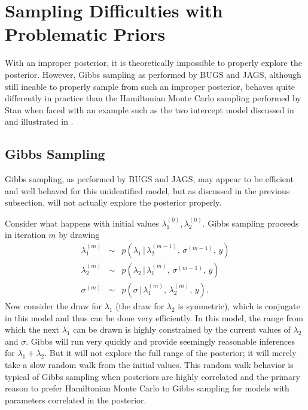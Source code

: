 \section{Sampling Difficulties with Problematic Priors}

With an improper posterior, it is theoretically impossible to properly
explore the posterior. However, Gibbs sampling as performed by BUGS
and JAGS, although still ineable to properly sample from such an
improper posterior, behaves quite differently in practice than the
Hamiltonian Monte Carlo sampling performed by Stan when faced with an
example such as the two intercept model discussed in
 and illustrated in
.

\subsection{Gibbs Sampling}

Gibbs sampling, as performed by BUGS and JAGS, may appear to be
efficient and well behaved for this unidentified model, but as
discussed in the previous subsection, will not actually explore the
posterior properly.

Consider what happens with initial values $\lambda_1^{(0)}, \lambda_2^{(0)}$.
Gibbs sampling proceeds in iteration $m$ by drawing
%
\begin{eqnarray*}
\lambda_1^{(m)} 
& \sim & p(\lambda_1 \, | \, \lambda_2^{(m-1)}, \, \sigma^{(m-1)}, \, y)
\\[6pt]
\lambda_2^{(m)}
& \sim & p(\lambda_2 \, | \, \lambda_1^{(m)}, \, \sigma^{(m-1)}, \, y)
\\[6pt]
\sigma^{(m)} 
& \sim & p(\sigma \, | \, \lambda_1^{(m)}, \, \lambda_2^{(m)}, \, y).
\end{eqnarray*}
%
Now consider the draw for $\lambda_1$ (the draw for $\lambda_2$ is
symmetric), which is conjugate in this model and thus can be done very
efficiently.  In this model, the range from which the next $\lambda_1$
can be drawn is highly constrained by the current values of
$\lambda_2$ and $\sigma$.  Gibbs will run very quickly and provide
seemingly reasonable inferences for $\lambda_1 + \lambda_2$.  But it
will not explore the full range of the posterior; it will merely take
a slow random walk from the initial values.  This random walk behavior
is typical of Gibbs sampling when posteriors are highly correlated and
the primary reason to prefer Hamiltonian Monte Carlo to Gibbs sampling
for models with parameters correlated in the posterior.

